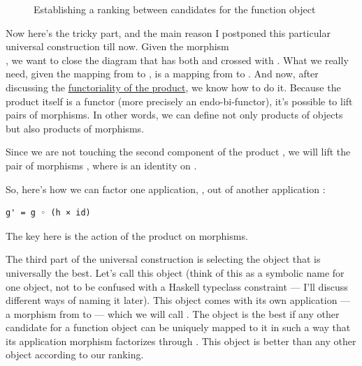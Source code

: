 \begin{figure}
\centering
{}
\caption{Establishing a ranking between candidates for the function object}
\end{figure}

Now here's the tricky part, and the main reason I postponed this
particular universal construction till now. Given the morphism\\
, we want to close the diagram
that has both  and  crossed with .
What we really need, given the mapping  from 
to , is a mapping from  to .
And now, after discussing the \hyperref[functoriality]{functoriality
of the product}, we know how to do it. Because the product itself is a
functor (more precisely an endo-bi-functor), it's possible to lift pairs
of morphisms. In other words, we can define not only products of objects
but also products of morphisms.

Since we are not touching the second component of the product
, we will lift the pair of morphisms
, where  is an identity on .

So, here's how we can factor one application, , out of another
application :

\begin{verbatim}
g' = g ◦ (h × id)
\end{verbatim}
The key here is the action of the product on morphisms.

The third part of the universal construction is selecting the object
that is universally the best. Let's call this object  (think
of this as a symbolic name for one object, not to be confused with a
Haskell typeclass constraint --- I'll discuss different ways of naming
it later). This object comes with its own application --- a morphism
from  to  --- which we will call
. The object  is the best if any other
candidate for a function object can be uniquely mapped to it in such a
way that its application morphism  factorizes through
. This object is better than any other object according to
our ranking.

